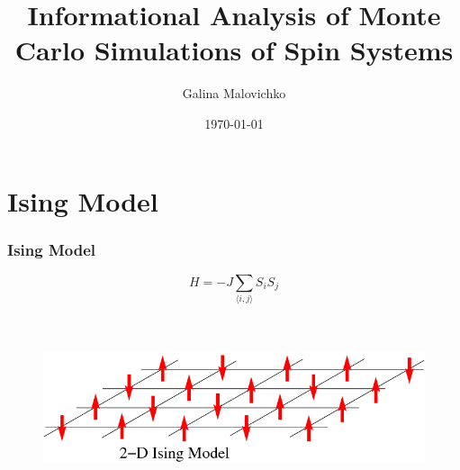 \documentclass{beamer}
\title[Spin Systems]{Informational Analysis of Monte Carlo Simulations of Spin Systems} %
\author{Galina Malovichko} %
\institute[UC Davis] %
{
University of California, Davis \\ %
\medskip
\textit{gmalovichko@ucdavis.edu} %
}
\date{\today} %
\begin{document}
\begin{frame}
\titlepage %
\end{frame}



\section{Ising Model} %

\begin{frame}
\frametitle{Ising Model}

$$ H = -J \sum_{\langle i, j \rangle}{S_i S_j} $$\\~\\

\begin{figure}
\includegraphics[width=0.8\linewidth]{ising.png}
\end{figure}

\end{frame}
\end{document}
